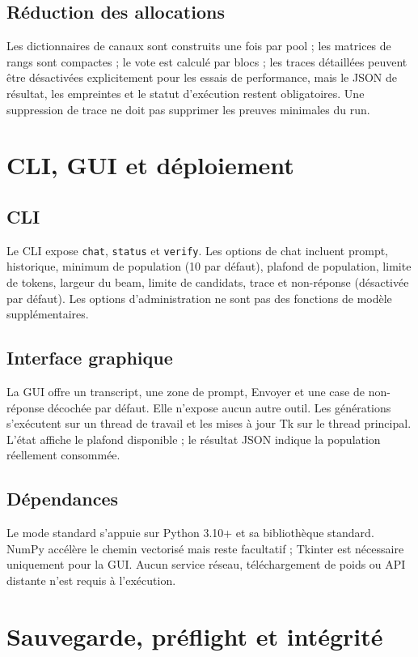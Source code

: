 \documentclass[11pt,a4paper]{report}
\begin{document}
\section{Réduction des allocations}
Les dictionnaires de canaux sont construits une fois par pool ; les matrices de rangs sont compactes ; le vote est calculé par blocs ; les traces détaillées peuvent être désactivées explicitement pour les essais de performance, mais le JSON de résultat, les empreintes et le statut d'exécution restent obligatoires. Une suppression de trace ne doit pas supprimer les preuves minimales du run.

\chapter{CLI, GUI et déploiement}
\section{CLI}
Le CLI expose \texttt{chat}, \texttt{status} et \texttt{verify}. Les options de chat incluent prompt, historique, minimum de population (10 par défaut), plafond de population, limite de tokens, largeur du beam, limite de candidats, trace et non-réponse (désactivée par défaut). Les options d'administration ne sont pas des fonctions de modèle supplémentaires.

\section{Interface graphique}
La GUI offre un transcript, une zone de prompt, Envoyer et une case de non-réponse décochée par défaut. Elle n'expose aucun autre outil. Les générations s'exécutent sur un thread de travail et les mises à jour Tk sur le thread principal. L'état affiche le plafond disponible ; le résultat JSON indique la population réellement consommée.

\section{Dépendances}
Le mode standard s'appuie sur Python 3.10+ et sa bibliothèque standard. NumPy accélère le chemin vectorisé mais reste facultatif ; Tkinter est nécessaire uniquement pour la GUI. Aucun service réseau, téléchargement de poids ou API distante n'est requis à l'exécution.

\chapter{Sauvegarde, préflight et intégrité}
\end{document}
